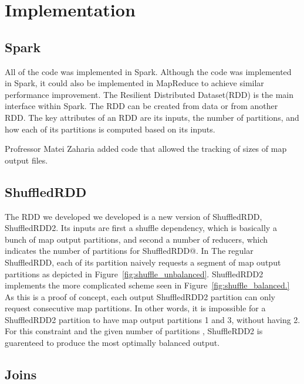 \chapter{Implementation}\label{intro-ch}

\section{Spark}

All of the code was implemented in Spark. Although the code was implemented in Spark, 
it could also be implemented in MapReduce to achieve similar performance improvement.
The  Resilient Distributed Dataset(RDD) is the main interface within Spark.
The RDD can be created from data or from another RDD. The key attributes of an RDD are its inputs,
the number of partitions, and how each of its partitions is computed based on its inputs.

 Profressor Matei Zaharia added code 
that allowed the tracking of sizes of map output files.   

\section{ShuffledRDD}

The RDD we developed we developed is a new version of ShuffledRDD, ShuffledRDD2. 
Its inputs are first a shuffle dependency, which is basically a bunch of map output partitions, and second a number of reducers, which indicates the 
number of partitions for ShuffledRDD@. 
In The regular ShuffledRDD, each of its partition naively requests a segment of map output partitions as depicted in Figure~\ref{fig:shuffle_unbalanced}.
ShuffledRDD2 implements the more complicated scheme seen in Figure~\ref{fig:shuffle_balanced.} 
As this is a proof of concept, each output ShuffledRDD2 partition can only request consecutive map partitions. In other words, it is impossible for a ShuffledRDD2 partition to have map output partitions 1 and 3, without having 2. For this constraint and the given number of partitions , ShuffleRDD2 is guarenteed to produce the most optimally balanced output. 

\section{Joins}

